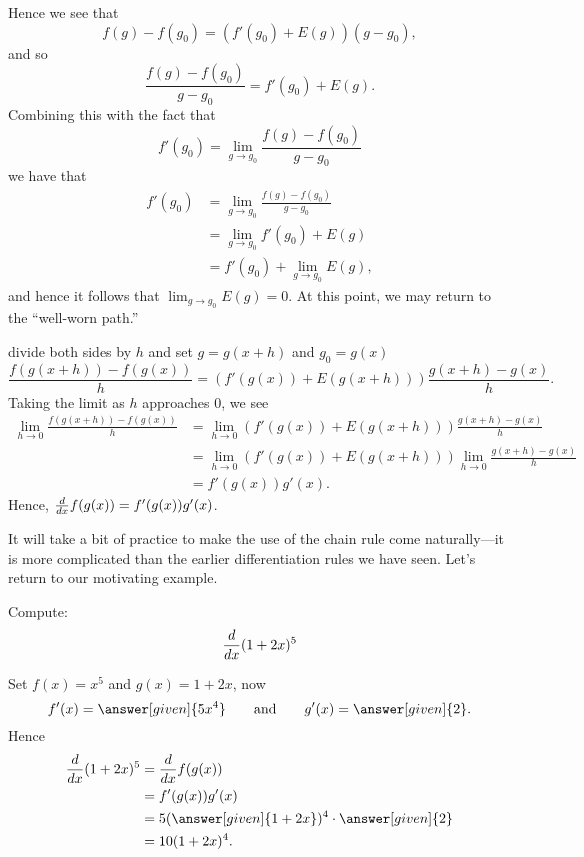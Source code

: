 \documentclass{ximera}
\begin{document}
\begin{explanation}
\begin{image}
\end{image}

Hence we see that
\[
f(g)-f(g_0) = \left(f'(g_0) + E(g)\right)(g-g_0),
\]
and so
\[
\frac{f(g)-f(g_0)}{g-g_0} = f'(g_0) + E(g).
\]
Combining this with the fact that 
\[
f'(g_0) = \lim_{g\to g_0} \frac{f(g)-f(g_0)}{g-g_0}
\]
we have that
\begin{align*}
f'(g_0) &= \lim_{g\to g_0}\frac{f(g)-f(g_0)}{g-g_0} \\
&= \lim_{g\to g_0}f'(g_0) + E(g)\\
&= f'(g_0) + \lim_{g\to g_0} E(g),
\end{align*}
and hence it follows that $\lim_{g\to g_0} E(g) = 0$. At this point,
we may return to the ``well-worn path.''




divide both sides by $h$ and set
$g=g(x+h)$ and $g_0=g(x)$
\[
\frac{f(g(x+h))-f(g(x))}{h} = \left(f'(g(x)) +
E(g(x+h))\right)\frac{g(x+h)-g(x)}{h}.
\]
Taking the limit as $h$ approaches $0$, we see 
\begin{align*}
\lim_{h\to 0}\frac{f(g(x+h))-f(g(x))}{h} &= \lim_{h\to 0}\left(f'(g(x))
+ E(g(x+h))\right)\frac{g(x+h)-g(x)}{h}\\
&= \lim_{h\to 0}\left(f'(g(x))
+ E(g(x+h))\right)\lim_{h\to 0}\frac{g(x+h)-g(x)}{h}\\
&= f'(g(x))g'(x).
\end{align*}
Hence, $\frac{d}{dx} f(g(x))= f'(g(x))g'(x)$.
\end{explanation}


It will take a bit of practice to make the use of the chain rule come
naturally---it is more complicated than the earlier differentiation
rules we have seen. Let's return to our motivating example.

\begin{example}
Compute:
\[
\frac{d}{dx} (1+2x)^5
\]

\begin{explanation}
Set $f(x) = x^5$ and $g(x) = 1+2x$, now
\[
f'(x) = \answer[given]{5x^4} \qquad\text{and}\qquad g'(x) = \answer[given]{2}.
\]
Hence
\begin{align*}
\ddx (1+2x)^5 &= \ddx f(g(x))\\ 
&=f'(g(x))g'(x) \\
&= 5(\answer[given]{1+2x})^4\cdot \answer[given]{2}\\
&= 10(1+2x)^4.
\end{align*}
\end{explanation}
\end{example}
\end{document}
